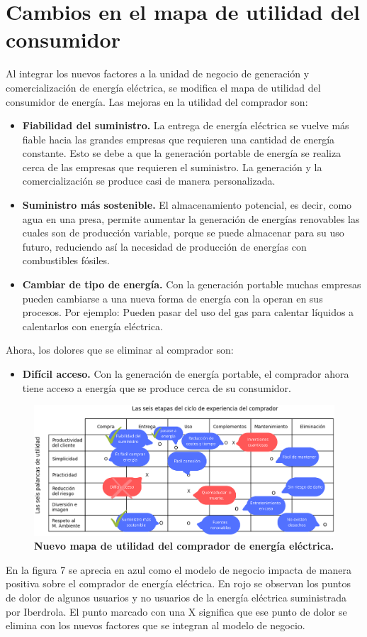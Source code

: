 \documentclass{article}
\begin{document}
\section{Cambios en el mapa de utilidad del consumidor} 
Al integrar los nuevos factores a la unidad de negocio de generación y comercialización de energía eléctrica, se modifica el mapa de utilidad del consumidor de energía. Las mejoras en la utilidad del comprador son:
\begin{itemize}
    \item \textbf{Fiabilidad del suministro.} La entrega de energía eléctrica se vuelve más fiable hacia las grandes empresas que requieren una cantidad de energía constante. Esto se debe a que la generación portable de energía se realiza cerca de las empresas que requieren el suministro. La generación y la comercialización se produce casi de manera personalizada. 
    \item \textbf{Suministro más sostenible.} El almacenamiento potencial, es decir, como agua en una presa, permite aumentar la generación de energías renovables las cuales son de producción variable, porque se puede almacenar para su uso futuro, reduciendo así la necesidad de producción de energías con combustibles fósiles.
    \item \textbf{Cambiar de tipo de energía.} Con la generación portable muchas empresas pueden cambiarse a una nueva forma de energía con la operan en sus procesos. Por ejemplo: Pueden pasar del uso del gas para calentar líquidos a calentarlos con energía eléctrica. 
\end{itemize}
Ahora, los dolores que se eliminar al comprador son: 
\begin{itemize}
    \item \textbf{Difícil acceso.} Con la generación de energía portable, el comprador ahora tiene acceso a energía que se produce cerca de su consumidor. 
\end{itemize}
\begin{figure}[h!]
    \centering
    \includegraphics[width=1\linewidth]{mapa de utilidad.png}
    \caption{\textbf{Nuevo mapa de utilidad del comprador de energía eléctrica.}}
    \label{fig:enter-label}
\end{figure}
En la figura 7 se aprecia en azul como el modelo de negocio impacta de manera positiva sobre el comprador de energía eléctrica. En rojo se observan los puntos de dolor de algunos usuarios y no usuarios de la energía eléctrica suministrada por Iberdrola. El punto marcado con una X significa que ese punto de dolor se elimina con los nuevos factores que se integran al modelo de negocio. 
\\
\end{document}
